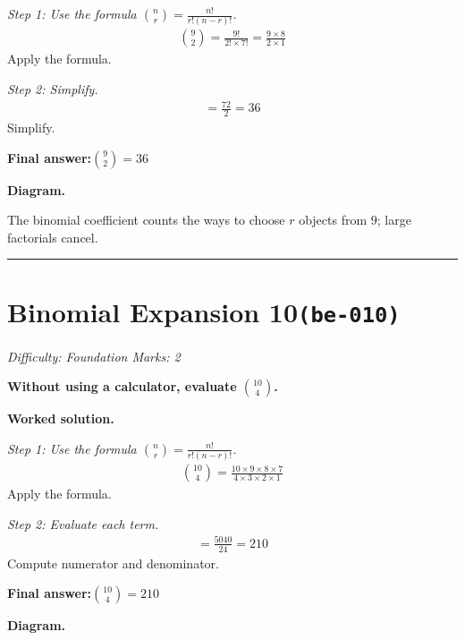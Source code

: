 \documentclass[11pt]{article}
\newcommand{\question}[1]{\par\medskip\noindent\textbf{#1}\par}
\begin{document}
\textit{Step 1: Use the formula \(\binom{n}{r} = \frac{n!}{r!(n-r)!}\).}
\[\begin{gathered}
\binom{9}{2} = \frac{9!}{2! \times 7!} = \frac{9 \times 8}{2 \times 1}
\end{gathered}\]
Apply the formula.

\textit{Step 2: Simplify.}
\[\begin{gathered}
= \frac{72}{2} = 36
\end{gathered}\]
Simplify.

\begin{answerbox}
\textbf{Final answer:}\quad \(\displaystyle \binom{9}{2} = 36\)
\end{answerbox}
\textbf{Diagram.}

\begin{center}
\end{center}
\small The binomial coefficient counts the ways to choose $r$ objects from $9$; large factorials cancel.\normalsize

\medskip\hrule

\section*{Binomial Expansion 10\quad\small\texttt{(be-010)}}
\textit{Difficulty: Foundation \quad\textbar\quad Marks: 2}

\question{Without using a calculator, evaluate \( \binom{10}{4} \).}

\textbf{Worked solution.}

\textit{Step 1: Use the formula \(\binom{n}{r} = \frac{n!}{r!(n-r)!}\).}
\[\begin{gathered}
\binom{10}{4} = \frac{10 \times 9 \times 8 \times 7}{4 \times 3 \times 2 \times 1}
\end{gathered}\]
Apply the formula.

\textit{Step 2: Evaluate each term.}
\[\begin{gathered}
= \frac{5040}{24} = 210
\end{gathered}\]
Compute numerator and denominator.

\begin{answerbox}
\textbf{Final answer:}\quad \(\displaystyle \binom{10}{4} = 210\)
\end{answerbox}
\textbf{Diagram.}
\end{document}
